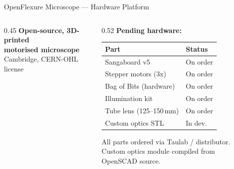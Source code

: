 \documentclass[aspectratio=169,11pt]{beamer}
\begin{document}
\begin{frame}{OpenFlexure Microscope --- Hardware Platform}

  \begin{columns}[T]
    \begin{column}{0.45\textwidth}
      \textbf{Open-source, 3D-printed}\\
      \textbf{motorised microscope}\\[0.3em]
      \small Cambridge, CERN-OHL license

      \vspace{0.8em}

    \end{column}

    \begin{column}{0.52\textwidth}
      \textbf{Pending hardware:}

      \vspace{0.3em}

      \begin{tabular}{@{}ll@{}}
        \toprule
        \textbf{Part} & \textbf{Status} \\
        \midrule
        Sangaboard v5            & On order \\
        Stepper motors (3x)      & On order \\
        Bag of Bits (hardware)   & On order \\
        Illumination kit         & On order \\
        Tube lens (125--150\,mm) & On order \\
        Custom optics STL        & In dev. \\
        \bottomrule
      \end{tabular}

      \vspace{0.8em}
      \small
      All parts ordered via Taulab / distributor.\\
      Custom optics module compiled from OpenSCAD source.
    \end{column}
  \end{columns}

\end{frame}
\end{document}
